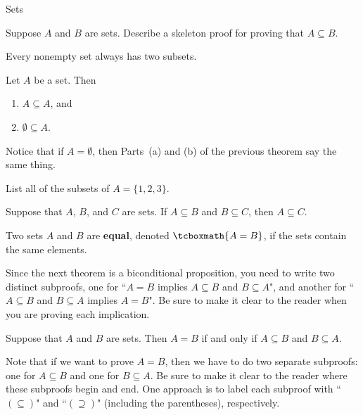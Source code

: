 \begin{section}{Sets}
\begin{problem}
Suppose $A$ and $B$ are sets.  Describe a skeleton proof for proving that $A\subseteq B$.
\end{problem}

Every nonempty set always has two subsets.

\begin{theorem}
Let $A$ be a set.  Then
\begin{enumerate}[label=\textrm{(\alph*)}]
\item $A\subseteq A$, and
\item $\emptyset \subseteq A$.
\end{enumerate}
\end{theorem}

Notice that if $A=\emptyset$, then Parts~(a) and (b) of the previous theorem say the same thing.

\begin{problem}
List all of the subsets of $A=\{1,2,3\}$.  %
\end{problem}

\begin{theorem}
Suppose that $A$, $B$, and $C$ are sets.  If $A\subseteq B$ and $B\subseteq C$, then $A\subseteq C$.
\end{theorem}

\begin{definition}
Two sets $A$ and $B$ are \textbf{equal}, denoted $\tcboxmath{A=B}$, if the sets contain the same elements.
\end{definition}

Since the next theorem is a biconditional proposition, you need to write two distinct subproofs, one for ``$A=B$ implies $A \subseteq B$ and $B \subseteq A$", and another for ``$A \subseteq B$ and $B \subseteq A$ implies $A=B$". Be sure to make it clear to the reader when you are proving each implication.

\begin{theorem}
Suppose that $A$ and $B$ are sets. Then $A=B$ if and only if $A \subseteq B$ and $B \subseteq A$.
\end{theorem}

Note that if we want to prove $A=B$, then we have to do two separate subproofs: one for $A\subseteq B$ and one for $B\subseteq A$. Be sure to make it clear to the reader where these subproofs begin and end. One approach is to label each subproof with ``$(\subseteq)$" and ``$(\supseteq)$" (including the parentheses), respectively.


\end{section}

